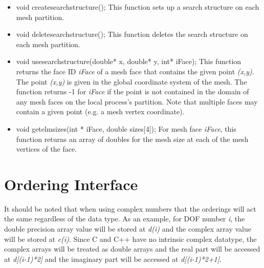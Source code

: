 \begin{itemize}
\item void createsearchstructure(); This function sets up a search structure on each mesh partition.  
\item void deletesearchstructure(); This function deletes the search structure on each mesh partition.
\item void usesearchstructure(double* x, double* y, int* iFace); This function returns the face ID \textit{iFace}
of a mesh face that contains the given point \textit{(x,y)}.  The point \textit{(x,y)} is given in the
global coordinate system of the mesh.  The function returns -1 for \textit{iFace} if the point is not contained
in the domain of any mesh faces on the local process's partition.  Note  that multiple faces may contain
a given point (e.g. a mesh vertex coordinate).
\item void getelmsizes(int * iFace, double sizes[4]); For mesh face \textit{iFace}, this function returns an array
of doubles for the mesh size at each of the mesh vertices of the face.  
\end{itemize}





\section{Ordering Interface}
It should be noted that when using complex numbers that the orderings will act the same regardless
of the data type. As an example, for DOF number \textit{i}, the double precision array value will 
be stored at \textit{d(i)} and the complex array value will be stored at \textit{c(i)}.  Since
C and C++ have no intrinsic complex datatype, the complex arrays will be treated as double arrays
and the real part will be accessed at \textit{d[(i-1)*2]} and the imaginary part will be
accessed at \textit{d[(i-1)*2+1]}.

